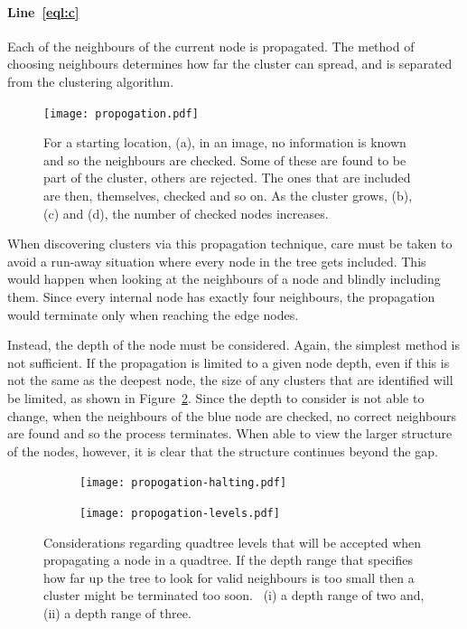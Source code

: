\paragraph{Line~\ref{eql:c}} Each of the neighbours of the current node is
propagated. The method of choosing neighbours determines how far the cluster
can spread, and is separated from the clustering algorithm.

\begin{figure}[tbhp]
	\centering
	\texttt{[image: propogation.pdf]}

	\caption[Propagation of a cluster from a starting location.]{For a starting
		location, (a), in an image, no information is known and so the
		neighbours are checked. Some of these are found to be part of the
		cluster, others are rejected. The ones that are included are then,
		themselves, checked and so on. As the cluster grows, (b), (c) and
		(d), the number of checked nodes increases.}\label{fig:propogation}
\end{figure}

When discovering clusters via this propagation technique, care must be taken to
avoid a run-away situation where every node in the tree gets included. This
would happen when looking at the neighbours of a node and blindly including
them. Since every internal node has exactly four neighbours, the propagation
would terminate only when reaching the edge nodes.

Instead, the depth of the node must be considered. Again, the simplest method
is not sufficient. If the propagation is limited to a given node depth, even if
this is not the same as the deepest node, the size of any clusters that are
identified will be limited, as shown in Figure~\ref{fig:propogation-halting}.
Since the depth to consider is not able to change, when the neighbours of the
blue node are checked, no correct neighbours are found and so the process
terminates. When able to view the larger structure of the nodes, however, it is
clear that the structure continues beyond the gap.

\begin{figure}[tbhp]
	\centering
	\begin{subfigure}[c]{5.2cm}
		\texttt{[image: propogation-halting.pdf]}
		\caption{}\label{fig:propogation-halting}
	\end{subfigure}%
	\quad
	\begin{subfigure}[c]{3.2cm}
		\texttt{[image: propogation-levels.pdf]}
		\caption{}\label{fig:propogation-levels}
	\end{subfigure}

	\caption[Considerations regarding quadtree levels to be
	accepted.]{Considerations regarding quadtree levels that will be accepted
		when propagating a node in a quadtree. 
		If the depth range that specifies how far up the tree to look for valid
		neighbours is too small then a cluster might be terminated too soon.
		~(i) a depth range of two and, (ii) a
		depth range of three.}\label{fig:prop-levels-halting}
\end{figure}

